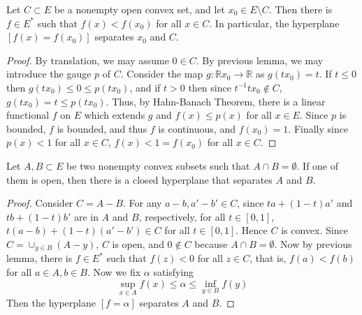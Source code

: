 \begin{lemma} Let $C\subset E$ be a nonempty open convex set, and let $x_0\in E\setminus C$. Then there is $f\in E^*$ such that $f(x)<f(x_0)$ for all $x\in C$. In particular, the hyperplane $[f(x)=f(x_0)]$ separates $x_0$ and $C$. 
\end{lemma}
\begin{proof}
By translation, we may assume $0\in C$. By previous lemma, we may introduce the gauge $p$ of $C$. Consider the map $g:\mathbb{R}x_0\rightarrow \mathbb{R}$ as $g(tx_0)=t$. If $t\leq 0$ then $g(tx_0)\leq 0\leq p(tx_0)$, and if $t>0$ then since $t^{-1} tx_0\notin C$, $g(t x_0)=t\leq p(t x_0)$. Thus, by Hahn-Banach Theorem, there is a linear functional $f$ on $E$ which extends $g$ and $f(x)\leq p(x)$ for all $x\in E$. Since $p$ is bounded, $f$ is bounded, and thus $f$ is continuous, and $f(x_0)=1$. Finally since $p(x)<1$ for all $x\in C$, $f(x)<1=f(x_0)$ for all $x\in C$.
\end{proof}

\begin{thm} Let $A,B\subset E$ be two nonempty convex subsets such that $A\cap B=\emptyset$. If one of them is open, then there is a closed hyperplane that separates $A$ and $B$.
\end{thm}
\begin{proof}
Consider $C=A-B$. For any $a-b, a'-b'\in C$, since $ta+(1-t)a'$ and $tb+(1-t)b'$ are in $A$ and $B$, respectively, for all $t\in [0,1]$, $t(a-b)+(1-t)(a'-b')\in C$ for all $t\in [0,1]$. Hence $C$ is convex. Since $C=\cup_{y\in B}(A-y)$, $C$ is open, and $0\notin C$ because $A\cap B=\emptyset$. Now by previous lemma, there is $f\in E^*$ such that $f(z)<0$ for all $z\in C$, that is, $f(a)<f(b)$ for all $a\in A, b\in B$. Now we fix $\alpha$ satisfying
\begin{equation}
\sup_{x\in A} f(x)\leq \alpha\leq \inf_{y\in B} f(y)
\end{equation}
Then the hyperplane $[f=\alpha]$ separates $A$ and $B$.
\end{proof}

